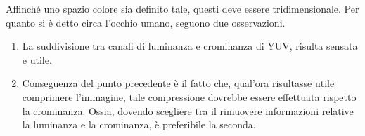 \documentclass{subfiles}
\begin{document}
Affinché uno spazio colore sia definito tale, questi deve essere tridimensionale.
Per quanto si è detto circa l'occhio umano, seguono due osservazioni.
\begin{enumerate}
    \item La suddivisione tra canali di luminanza e crominanza di YUV, risulta sensata e utile.
    \item Conseguenza del punto precedente è il fatto che, qual'ora risultasse utile comprimere l'immagine,
          tale compressione dovrebbe essere effettuata rispetto la crominanza. Ossia, dovendo scegliere tra il rimuovere informazioni relative la luminanza e la crominanza,
          è preferibile la seconda.
\end{enumerate}
\end{document}

